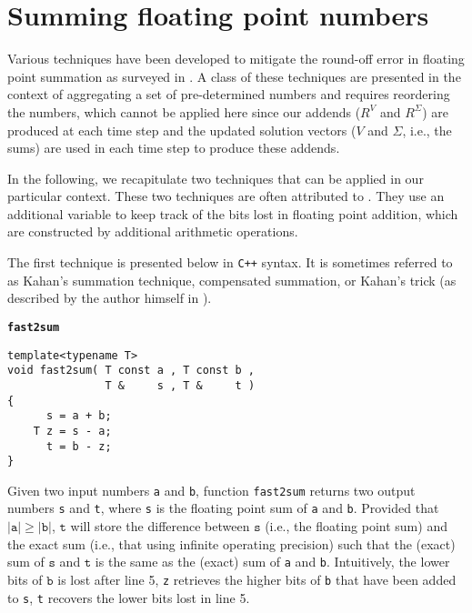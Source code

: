 \documentclass[10pt]{article}
\begin{document}
\section{Summing floating point numbers}\label{sec_compensated_sum}
%
Various techniques have been developed to mitigate the round-off error in floating point summation as surveyed in \cite{higham1993accuracy}. 
%
A class of these techniques are presented in the context of aggregating a set of pre-determined numbers and requires reordering the numbers, which cannot be applied here since our addends ($R^V$ and $R^\Sigma$) are produced at each time step and the updated solution vectors ($V$ and $\Sigma$, i.e., the sums) are used in each time step to produce these addends.


In the following, we recapitulate two techniques that can be applied in our particular context. These two techniques are often attributed to \cite{kahan1965pracniques,moller1965quasi,moller1965note,dekker1971floating,neumaier1974rundungsfehleranalyse}.
%
They use an additional variable to keep track of the bits lost in floating point addition, which are constructed by additional arithmetic operations.


The first technique is presented below in \texttt{C++} syntax.
%
It is sometimes referred to as Kahan's summation technique, compensated summation, or Kahan's trick (as described by the author himself in \cite{kahan1965pracniques}). 

\begin{mdframed}[linewidth=0pt]
\textbf{\texttt{\small fast2sum}}
\newline
\begin{minipage}{\paperwidth}
\begin{lstlisting}[tabsize=4,basicstyle=\ttfamily\scriptsize]
template<typename T>
void fast2sum( T const a , T const b ,
               T &     s , T &     t )
{
      s = a + b;
    T z = s - a;
      t = b - z;
}
\end{lstlisting}
\end{minipage}
%
\end{mdframed}

Given two input numbers \texttt{a} and \texttt{b}, function \texttt{fast2sum} returns two output numbers \texttt{s} and \texttt{t}, where \texttt{s} is the floating point sum of \texttt{a} and \texttt{b}.
%
Provided that $\vert\texttt a\vert\geq\vert\texttt b\vert$, $\texttt t$ will store the difference between $\texttt s$ (i.e., the floating point sum) and the exact sum (i.e., that using infinite operating precision) such that the (exact) sum of $\texttt{s}$ and $\texttt{t}$ is the same as the (exact) sum of \texttt{a} and \texttt{b}. 
%
Intuitively, the lower bits of $\texttt b$ is lost after line 5, \texttt{z} retrieves the higher bits of \texttt{b} that have been added to \texttt{s}, \texttt{t} recovers the lower bits lost in line 5.
\end{document}

